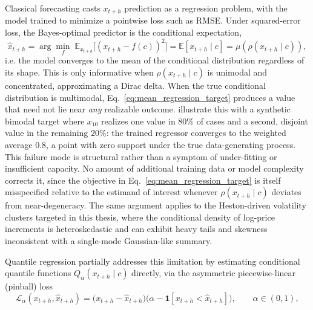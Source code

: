Classical forecasting casts $x_{t+h}$ prediction as a regression problem,
with the model trained to minimize a pointwise loss such as RMSE. 
Under squared-error loss, the Bayes-optimal predictor is the conditional expectation,
\begin{equation}
\label{eq:mean_regression_target}
\hat{x}_{t+h} = \arg\min_{f} \; \mathbb{E}_{x_{t+h}}\big[(x_{t+h} - f(c))^2\big] = \mathbb{E}[x_{t+h} \mid c] = \mu(\rho(x_{t+h}\mid c)),
\end{equation}
i.e. the model converges
to the mean of the conditional distribution 
regardless of its shape. 
This is only informative when $\rho(x_{t+h}\mid c)$ 
is unimodal and concentrated, approximating a Dirac delta. 
When the true conditional distribution is multimodal, Eq.~\ref{eq:mean_regression_target} 
produces a value that need not lie near \emph{any} 
realizable outcome. 
\cite{background:forgan} illustrate this with a synthetic bimodal target where $x_{10}$ 
realizes one value in $80\%$ of cases and a second, 
disjoint value in the remaining $20\%$: 
the trained regressor converges to the 
weighted average $0.8$, 
a point with zero support 
under the true data-generating process. 
This failure mode is structural rather 
than a symptom of under-fitting or 
insufficient capacity. 
No amount of additional training data or 
model complexity corrects it, since the objective
in Eq.~\ref{eq:mean_regression_target} is itself misspecified 
relative to the estimand of interest 
whenever $\rho(x_{t+h}\mid c)$ deviates 
from near-degeneracy. 
The same argument applies to the Heston-driven volatility clusters targeted in this thesis, 
where the conditional density of log-price increments is heteroskedastic 
and can exhibit heavy tails and skewness 
inconsistent with a single-mode Gaussian-like summary.

Quantile regression \cite{background:quantile_regression} partially 
addresses this limitation by estimating 
conditional quantile functions $Q_{\alpha}(x_{t+h}\mid c)$ directly, 
via the asymmetric piecewise-linear (pinball) loss
\begin{equation}
\label{eq:pinball_loss}
\mathcal{L}_{\alpha}(x_{t+h}, \hat{x}_{t+h}) = \big(x_{t+h} - \hat{x}_{t+h}\big)\big(\alpha - \mathbf{1}[x_{t+h} < \hat{x}_{t+h}]\big), \qquad \alpha \in (0,1),
\end{equation}

